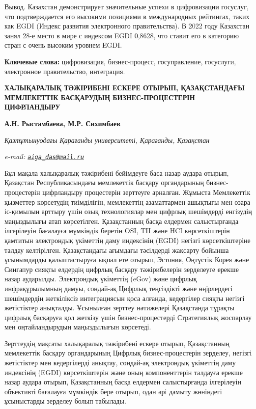 Вывод. Казахстан демонстрирует значительные успехи в цифровизации
госуслуг, что подтверждается его высокими позициями в международных
рейтингах, таких как EGDI (Индекс развития электронного правительства).
В 2022 году Казахстан занял 28-е место в мире с индексом EGDI 0,8628,
что ставит его в категорию стран с очень высоким уровнем EGDI.

{\bfseries Ключевые слова:} цифровизация, бизнес-процесс, госуправление,
госуслуги, электронное правительство, интеграция.

\begin{articleheader}
{\bfseries ХАЛЫҚАРАЛЫҚ ТӘЖІРИБЕНІ ЕСКЕРЕ ОТЫРЫП, ҚАЗАҚСТАНДАҒЫ МЕМЛЕКЕТТІК БАСҚАРУДЫҢ БИЗНЕС-ПРОЦЕСТЕРІН ЦИФРЛАНДЫРУ}

{\bfseries  
А.Н. Рыстамбаева\textsuperscript{\envelope },  
М.Р. Сихимбаев}
\end{articleheader}

\begin{affiliation}
\emph{Қазтұтынуодағы Қарағанды университеті, Қарағанды, Қазақстан}

\emph{e-mail: \href{mailto:aiga_das@mail.ru}{\nolinkurl{aiga\_das@mail.ru}}}
\end{affiliation}

Бұл мақала халықаралық тәжірибені бейімдеуге баса назар аудара отырып,
Қазақстан Республикасындағы мемлекеттік басқару органдарының
бизнес-процестерін цифрландыру процестерін зерттеуге арналған. Жұмыста
Мемлекеттік қызметтер көрсетудің тиімділігін, мемлекеттің азаматтармен
ашықтығы мен өзара іс-қимылын арттыру үшін озық технологиялар мен
цифрлық шешімдерді енгізудің маңыздылығы атап көрсетілген. Қазақстанның
басқа елдермен салыстырғанда ілгерілеуін бағалауға мүмкіндік беретін
OSI, TII және HCI көрсеткіштерін қамтитын электрондық үкіметтің даму
индексінің (EGDI) негізгі көрсеткіштеріне талдау келтірілген.
Қазақстандағы ағымдағы тәсілдерді жақсарту бойынша ұсынымдарды
қалыптастыруға ықпал ете отырып, Эстония, Оңтүстік Корея және Сингапур
сияқты елдердің цифрлық басқару тәжірибелерін зерделеуге ерекше назар
аударылды. Электрондық үкіметтің (eGov) және цифрлық инфрақұрылымның
дамуы, сондай-ақ Цифрлық теңсіздікті және өңірлердегі шешімдердің
жеткіліксіз интеграциясын қоса алғанда, кедергілер сияқты негізгі
жетістіктер анықталды. Ұсынылған зерттеу нәтижелері Қазақстанда тұрақты
цифрлық басқаруға қол жеткізу үшін бизнес-процестерді Стратегиялық
жоспарлау мен оңтайландырудың маңыздылығын көрсетеді.

Зерттеудің мақсаты халықаралық тәжірибені ескере отырып, Қазақстанның
мемлекеттік басқару органдарының Цифрлық бизнес-процестерін зерделеу,
негізгі жетістіктер мен кедергілерді анықтау, сондай-ақ электрондық
үкіметтің даму индексінің (EGDI) көрсеткіштерін және оның компоненттерін
талдауға ерекше назар аудара отырып, Қазақстанның басқа елдермен
салыстырғанда ілгерілеуін объективті бағалауға мүмкіндік бере отырып,
одан әрі дамыту жөніндегі ұсыныстарды зерделеу болып табылады.

